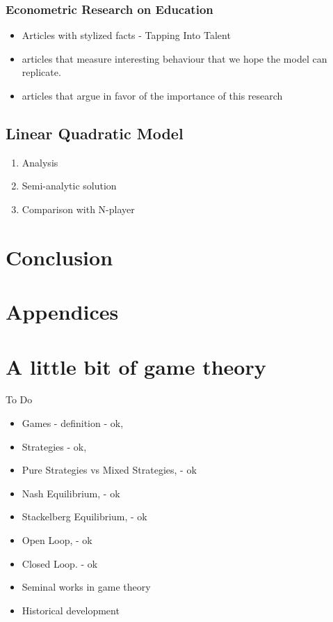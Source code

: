 \documentclass{article}
\begin{document}
\subsubsection{Econometric Research on Education}
\begin{itemize}
    \item Articles with stylized facts - Tapping Into Talent
    \item articles that measure interesting behaviour that we hope the model can replicate.
    \item articles that argue in favor of the importance of this research
\end{itemize}


\subsection{Linear Quadratic Model}
\begin{enumerate}
    \item Analysis
    \item Semi-analytic solution
    \item Comparison with N-player
\end{enumerate}


\section{Conclusion}

\appendix
{}
\section*{Appendices}
\section{A little bit of game theory}\label{appendix-game-theory}
To Do
\begin{itemize}
    \item Games - definition - ok, 
    \item Strategies - ok, 
    \item Pure Strategies vs Mixed Strategies, - ok
    \item Nash Equilibrium, - ok 
    \item Stackelberg Equilibrium,  - ok
    \item Open Loop, - ok
    \item Closed Loop. - ok
    \item Seminal works in game theory
    \item Historical development
\end{itemize}
\end{document}
